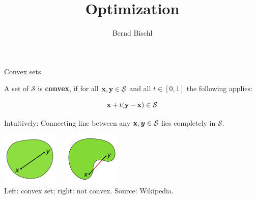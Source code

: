 



\usepackage[export]{adjustbox}


\newcommand{\titlefigure}{figure_man/convex.png}
\newcommand{\learninggoals}{
\item Convex sets
\item Convex functions
}



\title{Optimization}
\author{Bernd Bischl}
\date{}



\sloppy




\begin{vbframe}{Convex sets}

A set of $\mathcal{S}$ is \textbf{convex}, if for all $\mathbf{x}, \mathbf{y} \in \mathcal{S}$ and all $t \in [0, 1]$ the following applies:

$$
\mathbf{x} + t (\mathbf{y} - \mathbf{x}) \in \mathcal{S}
$$

Intuitively: Connecting line between any $\mathbf{x}, \bm{y} \in \mathcal{S}$ lies completely in $\mathcal{S}$.

\begin{center}
\includegraphics[width = 0.2\textwidth]{figure_man/convex.png}~~~\includegraphics[width = 0.2\textwidth]{figure_man/concave.png} \\
\footnotesize{Left: convex set; right: not convex. Source: Wikipedia. 
}
\end{center}

\end{vbframe}

